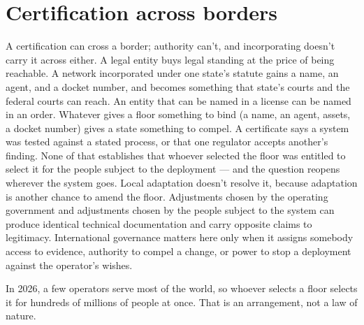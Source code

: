 \section{Certification across borders}
\label{sec:15.1}
A certification can cross a border; authority can't, and incorporating doesn't carry it across either. A legal entity buys legal standing at the price of being reachable. A network incorporated under one state's statute gains a name, an agent, and a docket number, and becomes something that state's courts and the federal courts can reach. An entity that can be named in a license can be named in an order. Whatever gives a floor something to bind (a name, an agent, assets, a docket number) gives a state something to compel. A certificate says a system was tested against a stated process, or that one regulator accepts another's finding. None of that establishes that whoever selected the floor was entitled to select it for the people subject to the deployment — and the question reopens wherever the system goes. Local adaptation doesn't resolve it, because adaptation is another chance to amend the floor. Adjustments chosen by the operating government and adjustments chosen by the people subject to the system can produce identical technical documentation and carry opposite claims to legitimacy. International governance matters here only when it assigns somebody access to evidence, authority to compel a change, or power to stop a deployment against the operator's wishes.

In 2026, a few operators serve most of the world, so whoever selects a floor selects it for hundreds of millions of people at once. That is an arrangement, not a law of nature.
